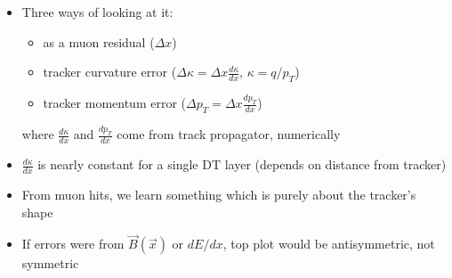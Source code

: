 \documentclass[compress]{beamer}
\begin{document}
\begin{frame}
\begin{columns}
\begin{itemize}
\item Three ways of looking at it:
\begin{itemize}
\item as a muon residual ($\Delta x$)
\item tracker curvature error ($\Delta \kappa = \Delta x \frac{d\kappa}{dx}$, $\kappa = q/p_T$)
\item tracker momentum error ($\Delta p_T = \Delta x \frac{dp_T}{dx}$)
\end{itemize}
where $\frac{d\kappa}{dx}$ and $\frac{dp_T}{dx}$ come from track propagator, numerically

\item $\frac{d\kappa}{dx}$ is nearly constant for a single DT layer (depends on distance from tracker)

\item From muon hits, we learn something which is purely about the tracker's shape

\item If errors were from $\vec{B}(\vec{x})$ or $dE/dx$, top plot would be antisymmetric, not symmetric
\end{itemize}
\end{columns}
\end{frame}
\end{document}
